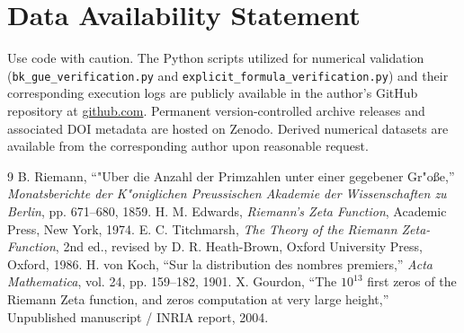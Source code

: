 \documentclass[11pt,a4paper]{article}
\begin{document}
\section*{Data Availability Statement}
Use code with caution.
The Python scripts utilized for numerical validation (\nolinkurl{bk_gue_verification.py} and \nolinkurl{explicit_formula_verification.py}) and their corresponding execution logs are publicly available in the author's GitHub repository at \url{github.com}. Permanent version-controlled archive releases and associated DOI metadata are hosted on Zenodo. Derived numerical datasets are available from the corresponding author upon reasonable request.
\begin{thebibliography}{9}
B. Riemann, ``"{U}ber die Anzahl der Primzahlen unter einer gegebener Gr"{o}{\ss}e,'' \textit{Monatsberichte der K"{o}niglichen Preussischen Akademie der Wissenschaften zu Berlin}, pp. 671--680, 1859.
H. M. Edwards, \textit{Riemann's Zeta Function}, Academic Press, New York, 1974.
E. C. Titchmarsh, \textit{The Theory of the Riemann Zeta-Function}, 2nd ed., revised by D. R. Heath-Brown, Oxford University Press, Oxford, 1986.
H. von Koch, ``Sur la distribution des nombres premiers,'' \textit{Acta Mathematica}, vol. 24, pp. 159--182, 1901.
X. Gourdon, ``The $10^{13}$ first zeros of the Riemann Zeta function, and zeros computation at very large height,'' Unpublished manuscript / INRIA report, 2004.
\end{thebibliography}
\end{document}
